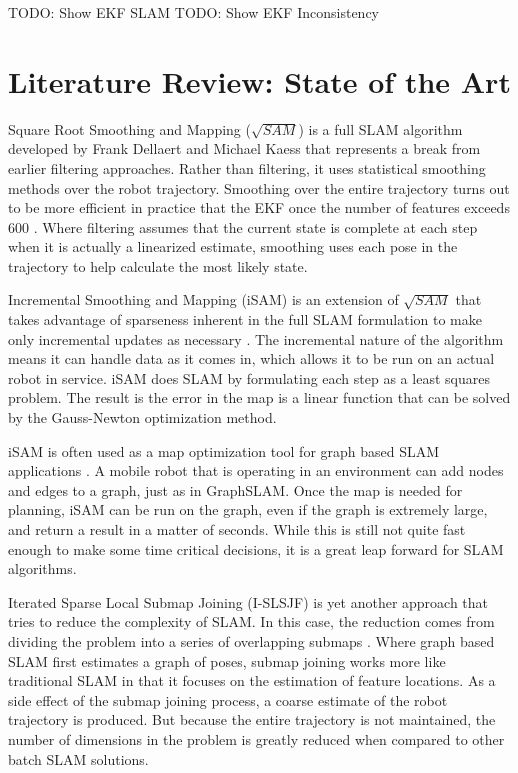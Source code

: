 \documentclass[12pt]{report}
\begin{document}
TODO: Show EKF SLAM
TODO: Show EKF Inconsistency

\chapter{Literature Review: State of the Art}

Square Root Smoothing and Mapping ($\sqrt{SAM}$) is a full SLAM algorithm developed by Frank Dellaert and Michael Kaess that represents a break from earlier filtering approaches. Rather than filtering, it uses statistical smoothing methods over the robot trajectory.  Smoothing over the entire trajectory turns out to be more efficient in practice that the EKF once the number of features exceeds 600 \cite{Dellaert06ijrr}.  Where filtering assumes that the current state is complete at each step when it is actually a linearized estimate, smoothing uses each pose in the trajectory to help calculate the most likely state.

Incremental Smoothing and Mapping (iSAM) is an extension of $\sqrt{SAM}$ that takes advantage of sparseness inherent in the full SLAM formulation to make only incremental updates as necessary \cite{Kaess08tro}. The incremental nature of the algorithm means it can handle data as it comes in, which allows it to be run on an actual robot in service.  iSAM does SLAM by formulating each step as a least squares problem.  The result is the error in the map is a linear function that can be solved by the Gauss-Newton optimization method.

iSAM is often used as a map optimization tool for graph based SLAM applications \cite{Sunderhauf}.  A mobile robot that is operating in an environment can add nodes and edges to a graph, just as in GraphSLAM.  Once the map is needed for planning, iSAM can be run on the graph, even if the graph is extremely large, and return a result in a matter of seconds.  While this is still not quite fast enough to make some time critical decisions, it is a great leap forward for SLAM algorithms.

Iterated Sparse Local Submap Joining (I-SLSJF) is yet another approach that tries to reduce the complexity of SLAM.  In this case, the reduction comes from dividing the problem into a series of overlapping submaps  \cite{huang2008iterated}.  Where graph based SLAM first estimates a graph of poses, submap joining works more like traditional SLAM in that it focuses on the estimation of feature locations.  As a side effect of the submap joining process, a coarse estimate of the robot trajectory is produced.  But because the entire trajectory is not maintained, the number of dimensions in the problem is greatly reduced when compared to other batch SLAM solutions.
\end{document}
